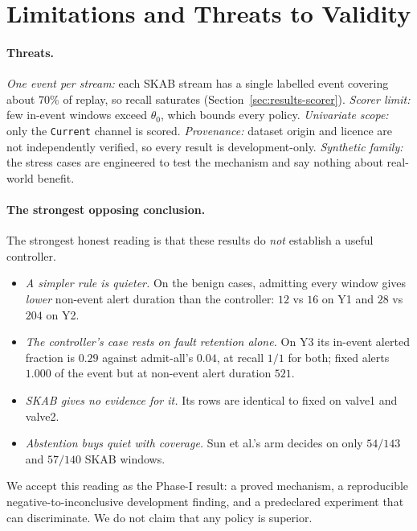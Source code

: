 \section{Limitations and Threats to Validity}\label{sec:limitations}

\paragraph{Threats.}
\emph{One event per stream:} each SKAB stream has a single labelled event covering
about 70\% of replay, so recall saturates (Section~\ref{sec:results-scorer}).
\emph{Scorer limit:} few in-event windows exceed $\theta_0$, which bounds every policy.
\emph{Univariate scope:} only the \texttt{Current} channel is scored.
\emph{Provenance:} dataset origin and licence are not independently verified, so every
result is development-only. \emph{Synthetic family:} the stress cases are engineered to
test the mechanism and say nothing about real-world benefit.

\paragraph{The strongest opposing conclusion.}
The strongest honest reading is that these results do \emph{not} establish a useful
controller.
\begin{itemize}[leftmargin=1.4em, itemsep=1pt, topsep=1pt]
  \item \emph{A simpler rule is quieter.} On the benign cases, admitting every window
    gives \emph{lower} non-event alert duration than the controller: $12$ vs $16$ on Y1
    and $28$ vs $204$ on Y2.
  \item \emph{The controller's case rests on fault retention alone.} On Y3 its in-event
    alerted fraction is $0.29$ against admit-all's $0.04$, at recall $1/1$ for both;
    fixed alerts $1.000$ of the event but at non-event alert duration $521$.
  \item \emph{SKAB gives no evidence for it.} Its rows are identical to fixed on valve1
    and valve2.
  \item \emph{Abstention buys quiet with coverage.} Sun et al.'s arm decides on only
    $54/143$ and $57/140$ SKAB windows.
\end{itemize}
We accept this reading as the Phase-I result: a proved mechanism, a reproducible
negative-to-inconclusive development finding, and a predeclared experiment that can
discriminate. We do not claim that any policy is superior.

